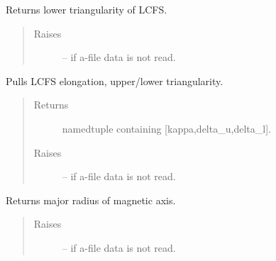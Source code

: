 \documentclass[letterpaper,10pt,english]{sphinxmanual}
\begin{document}
\begin{fulllineitems}
\begin{fulllineitems}
\end{fulllineitems}


\begin{fulllineitems}
\label{eqtools:eqtools.eqdskreader.EqdskReader.getLowerTriangularity}
Returns lower triangularity of LCFS.
\begin{quote}\begin{description}
\item[{Raises }] \leavevmode
{} -- 
if a-file data is not read.

\end{description}\end{quote}

\end{fulllineitems}


\begin{fulllineitems}
\label{eqtools:eqtools.eqdskreader.EqdskReader.getShaping}
Pulls LCFS elongation, upper/lower triangularity.
\begin{quote}\begin{description}
\item[{Returns}] \leavevmode
namedtuple containing {[}kappa,delta\_u,delta\_l{]}.

\item[{Raises }] \leavevmode
{} -- 
if a-file data is not read.

\end{description}\end{quote}

\end{fulllineitems}


\begin{fulllineitems}
\label{eqtools:eqtools.eqdskreader.EqdskReader.getMagR}
Returns major radius of magnetic axis.
\begin{quote}\begin{description}
\item[{Raises }] \leavevmode
{} -- 
if a-file data is not read.


\end{description}
\end{quote}
\end{fulllineitems}
\end{fulllineitems}
\end{document}
